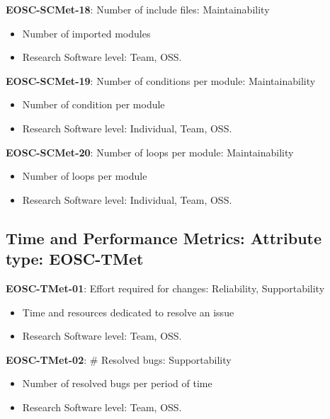 \textbf{EOSC-SCMet-18}: Number of include files: Maintainability

\begin{itemize}
    \item Number of imported modules~\cite{ogasawara_experiences_1996}
    \item Research Software level: Team, OSS.
\end{itemize}

\textbf{EOSC-SCMet-19}: Number of conditions per module: Maintainability

\begin{itemize}
    \item Number of condition per module~\cite{ogasawara_experiences_1996}
    \item Research Software level: Individual, Team, OSS.
\end{itemize}

\textbf{EOSC-SCMet-20}: Number of loops per module: Maintainability

\begin{itemize}
    \item Number of loops per module~\cite{ogasawara_experiences_1996}
    \item Research Software level: Individual, Team, OSS.
\end{itemize}

\subsection{Time and Performance Metrics: Attribute type: EOSC-TMet}

\textbf{EOSC-TMet-01}: Effort required for changes: Reliability, Supportability

\begin{itemize}
    \item Time and resources dedicated to resolve an issue~\cite{montagud_systematic_2012}
    \item Research Software level: Team, OSS.
\end{itemize}

\textbf{EOSC-TMet-02}: \# Resolved bugs: Supportability

\begin{itemize}
    \item Number of resolved bugs per period of time~\cite{montagud_systematic_2012}
    \item Research Software level: Team, OSS.
\end{itemize}

